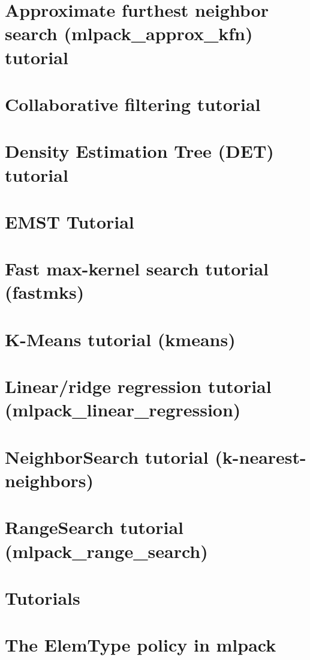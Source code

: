 \documentclass[twoside]{book}
\newcommand{\+}{\discretionary{\mbox{\scriptsize$\hookleftarrow$}}{}{}}
\begin{document}
\chapter{Approximate furthest neighbor search (mlpack\+\_\+approx\+\_\+kfn) tutorial}
\label{akfntutorial}

\chapter{Collaborative filtering tutorial}
\label{cftutorial}

\chapter{Density Estimation Tree (D\+ET) tutorial}
\label{dettutorial}

\chapter{E\+M\+ST Tutorial}
\label{emst_tutorial}

\chapter{Fast max-\/kernel search tutorial (fastmks)}
\label{fmkstutorial}

\chapter{K-\/\+Means tutorial (kmeans)}
\label{kmtutorial}

\chapter{Linear/ridge regression tutorial (mlpack\+\_\+linear\+\_\+regression)}
\label{lrtutorial}

\chapter{Neighbor\+Search tutorial (k-\/nearest-\/neighbors)}
\label{nstutorial}

\chapter{Range\+Search tutorial (mlpack\+\_\+range\+\_\+search)}
\label{rstutorial}

\chapter{Tutorials}
\label{tutorials}

\chapter{The Elem\+Type policy in mlpack}
\label{elem}

\end{document}
